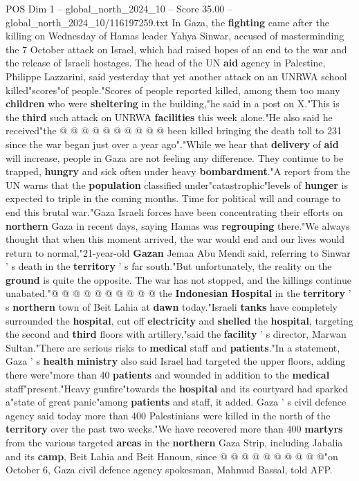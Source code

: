 \begin{textsample}{POS Dim 1 – global\_north\_2024\_10 – Score 35.00 – global\_north\_2024\_10/116197259.txt}
In Gaza, the \textbf{fighting} came after the killing on Wednesday of Hamas leader Yahya Sinwar, accused of masterminding the 7 October attack on Israel, which had raised hopes of an end to the war and the release of Israeli hostages.
The head of the UN \textbf{aid} agency in Palestine, Philippe Lazzarini, said yesterday that yet another attack on an UNRWA school killed"scores"of people."Scores of people reported killed, among them too many \textbf{children} who were \textbf{sheltering} in the building,"he said in a post on X."This is the \textbf{third} such attack on UNRWA \textbf{facilities} this week alone."He also said he received"the @ @ @ @ @ @ @ @ @ @ been killed bringing the death toll to 231 since the war began just over a year ago"."While we hear that \textbf{delivery} of \textbf{aid} will increase, people in Gaza are not feeling any difference.
They continue to be trapped, \textbf{hungry} and sick often under heavy \textbf{bombardment}."A report from the UN warns that the \textbf{population} classified under"catastrophic"levels of \textbf{hunger} is expected to triple in the coming months.
Time for political will and courage to end this brutal war."Gaza Israeli forces have been concentrating their efforts on \textbf{northern} Gaza in recent days, saying Hamas was \textbf{regrouping} there."We always thought that when this moment arrived, the war would end and our lives would return to normal,"21-year-old \textbf{Gazan} Jemaa Abu Mendi said, referring to Sinwar ' s death in the \textbf{territory} ' s far south."But unfortunately, the reality on the \textbf{ground} is quite the opposite.
The war has not stopped, and the killings continue unabated."@ @ @ @ @ @ @ @ @ @ the \textbf{Indonesian} \textbf{Hospital} in the \textbf{territory} ' s \textbf{northern} town of Beit Lahia at \textbf{dawn} today."Israeli \textbf{tanks} have completely surrounded the \textbf{hospital}, cut off \textbf{electricity} and \textbf{shelled} the \textbf{hospital}, targeting the second and \textbf{third} floors with artillery,"said the \textbf{facility} ' s director, Marwan Sultan."There are serious risks to \textbf{medical} staff and \textbf{patients}."In a statement, Gaza ' s \textbf{health} \textbf{ministry} also said Israel had targeted the upper floors, adding there were"more than 40 \textbf{patients} and wounded in addition to the \textbf{medical} staff"present."Heavy gunfire"towards the \textbf{hospital} and its courtyard had sparked a"state of great panic"among \textbf{patients} and staff, it added.
Gaza ' s civil defence agency said today more than 400 Palestinians were killed in the north of the \textbf{territory} over the past two weeks."We have recovered more than 400 \textbf{martyrs} from the various targeted \textbf{areas} in the \textbf{northern} Gaza Strip, including Jabalia and its \textbf{camp}, Beit Lahia and Beit Hanoun, since @ @ @ @ @ @ @ @ @ @"on October 6, Gaza civil defence agency spokesman, Mahmud Bassal, told AFP.

\end{textsample}
